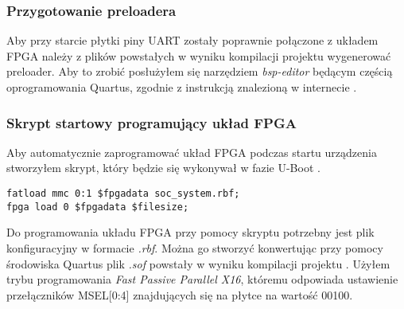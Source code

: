 \subsubsection{Przygotowanie preloadera}
Aby przy starcie płytki piny UART zostały poprawnie połączone z układem FPGA należy z plików powstałych w wyniku kompilacji projektu wygenerować preloader. Aby to zrobić posłużyłem się narzędziem \textit{bsp-editor} będącym częścią oprogramowania Quartus, zgodnie z instrukcją znalezioną w internecie \cite{rocketboards-preloader}.

\subsubsection{Skrypt startowy programujący układ FPGA}
Aby automatycznie zaprogramować układ FPGA podczas startu urządzenia stworzyłem skrypt, który będzie się wykonywał w fazie U-Boot \cite{rocketboards-uboot-script}.
\begin{lstlisting}
fatload mmc 0:1 $fpgadata soc_system.rbf;
fpga load 0 $fpgadata $filesize;
\end{lstlisting}
Do programowania układu FPGA przy pomocy skryptu potrzebny jest plik konfiguracyjny w formacie \textit{.rbf}. Można go stworzyć konwertując przy pomocy środowiska Quartus plik \textit{.sof} powstały w wyniku kompilacji projektu \cite{rocketboards-sof-to-rfb}. Użyłem trybu programowania \textit{Fast Passive Parallel X16}, któremu odpowiada ustawienie przełączników MSEL[0:4] znajdujących się na płytce na wartość 00100.

